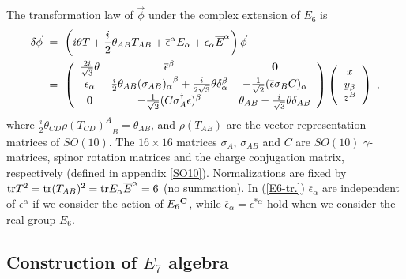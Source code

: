 \documentclass[a4paper,11pt]{article}
\newcommand{\ol}{\overline}
\newcommand{\tr}{{\rm tr}}
\begin{document}
{\begin{appendix}
The transformation law of $\vec{\phi}$ under 
the complex extension of $E_6$ is
\begin{align}
\delta \vec{\phi}
\ &= \ \left(i \theta T + \frac{i}{2} \theta_{AB} T_{AB} 
    + \ol{\epsilon}^{\alpha} E_{\alpha} 
    + \epsilon_{\alpha} \ol{E}^{\alpha} \right) 
  \vec{\phi} \nonumber \\
\ &= \ \left(
\begin{array}{ccc} 
\frac{2 i}{\sqrt{3}} \theta & \ol{\epsilon}^{\beta} & {\bf 0} \\
\epsilon_{\alpha} & 
\frac{i}{2} \theta_{AB}{(\sigma_{AB})_{\alpha}}^{\beta} 
+ \frac{i}{2\sqrt{3}} \theta \delta_{\alpha}^{\beta} & 
-\frac{1}{\sqrt{2}} (\ol{\epsilon} \sigma_B C)_{\alpha} \\
{\bf 0} & - \frac{1}{\sqrt{2}} (C \sigma_A^{\dagger} \epsilon )^{\beta} &
          \theta_{AB} - \frac{i}{\sqrt{3}} \theta \delta_{AB}
\end{array} \right) \left(
\begin{array}{c}
x \\
y_{\beta} \\
z^B 
\end{array} \right) \; , \label{E6-tr.}
\end{align}
where $\frac{i}{2} \theta_{CD} \rho{(T_{CD})^A}_B = \theta_{AB}$, 
and $\rho(T_{AB})$ are the vector representation 
matrices of $SO(10)$. 
The $16 \times 16$ matrices $\sigma_A$, $\sigma_{AB}$ and $C$ are 
$SO(10)$ $\gamma$-matrices, 
spinor rotation matrices 
and the charge conjugation matrix, respectively (defined in appendix
\ref{SO10}). 
Normalizations are fixed by 
$\tr T^2 = \tr (T_{AB})^2 
= \tr E_{\alpha} \ol{E}^{\alpha}=6$ (no summation).
In (\ref{E6-tr.}) 
$\ol{\epsilon}_{\alpha}$ are independent of $\epsilon^{\alpha}$ 
if we consider the action of $E_6{}^{\bf C}$, 
while $\ol{\epsilon}_{\alpha} = \epsilon^{*{\alpha}}$ hold 
when we consider the real group $E_6$. 



\subsection{Construction of $E_7$ algebra}


\end{appendix}}
\end{document}
